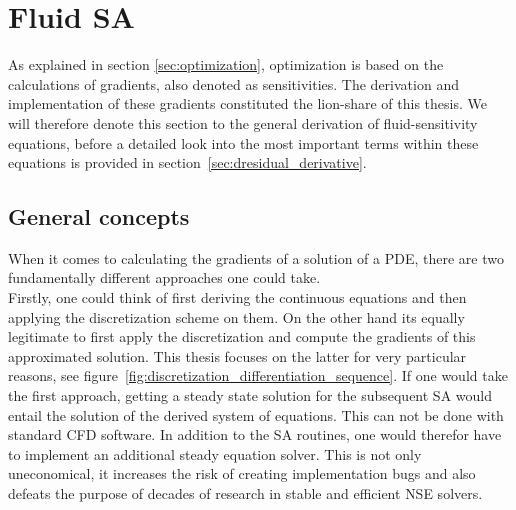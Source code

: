 \documentclass[../main.tex]{subfiles}
\begin{document}
\section{Fluid \acf{SA}}\label{sec:SA}
As explained in section \ref{sec:optimization}, optimization is based on the calculations of gradients, also denoted as sensitivities.
The derivation and implementation of these gradients constituted the lion-share of this thesis. We will therefore denote this section to the general derivation of fluid-sensitivity equations, before a detailed look into the most important terms within these equations is provided in section~\ref{sec:dresidual_derivative}.

\subsection{General concepts}
When it comes to calculating the gradients of a solution of a \ac{PDE}, there are two fundamentally different approaches one could take.\\
Firstly, one could think of first deriving the continuous equations and then applying the discretization scheme on them. On the other hand its equally legitimate to first apply the discretization and compute the gradients of this approximated solution. This thesis focuses on the latter for very particular reasons, see figure~\ref{fig:discretization_differentiation_sequence}.
If one would take the first approach, getting a steady state solution for the subsequent \acf{SA} would entail the solution of the derived system of equations. This can not be done with standard CFD software. In addition to the \ac{SA} routines, one would therefor have to implement an additional steady equation solver. This is not only uneconomical, it increases the risk of creating implementation bugs and also defeats the purpose of decades of research in stable and efficient \ac{NSE} solvers.
\end{document}
